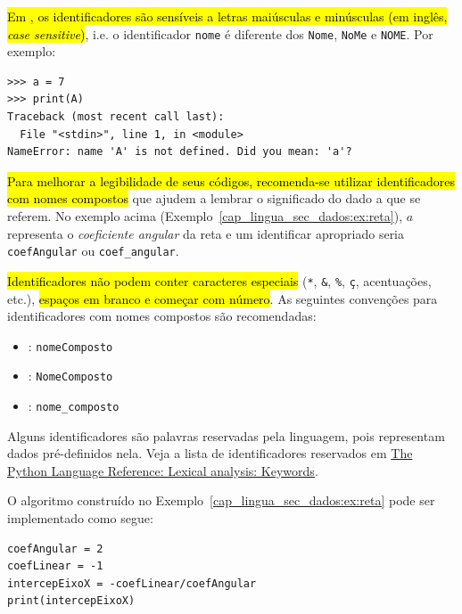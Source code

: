 \hl{Em {\python}, os identificadores são sensíveis a letras maiúsculas e minúsculas (em inglês, \textit{case sensitive})}, i.e. o identificador \lstinline+nome+ é diferente dos \lstinline+Nome+, \lstinline+NoMe+ e \lstinline+NOME+. Por exemplo:

\begin{lstlisting}
>>> a = 7
>>> print(A)
Traceback (most recent call last):
  File "<stdin>", line 1, in <module>
NameError: name 'A' is not defined. Did you mean: 'a'?
\end{lstlisting}

\hl{Para melhorar a legibilidade de seus códigos, recomenda-se utilizar identificadores com nomes compostos} que ajudem a lembrar o significado do dado a que se referem. No exemplo acima (Exemplo~\ref{cap_lingua_sec_dados:ex:reta}), $a$ representa o \emph{coeficiente angular} da reta e um identificar apropriado seria \lstinline+coefAngular+ ou \lstinline+coef_angular+.

\hl{Identificadores não podem conter caracteres especiais} (\lstinline+*+, \lstinline+&+, \lstinline+%+,
\lstinline+ç+, acentuações, etc.), \hl{espaços em branco e começar com número}. As seguintes convenções para identificadores com nomes compostos são recomendadas:
\begin{itemize}
\item {}: \lstinline+nomeComposto+
\item {}: \lstinline+NomeComposto+
\item {}: \lstinline+nome_composto+
\end{itemize}

Alguns identificadores são palavras reservadas pela linguagem, pois representam dados pré-definidos nela. Veja a lista de identificadores reservados em \href{https://docs.python.org/3/reference/lexical_analysis.html\#keywords}{The Python Language Reference: Lexical analysis: Keywords}.

\begin{ex}
  O algoritmo construído no Exemplo~\ref{cap_lingua_sec_dados:ex:reta} pode ser implementado como segue:

\begin{lstlisting}
coefAngular = 2
coefLinear = -1
intercepEixoX = -coefLinear/coefAngular
print(intercepEixoX)
\end{lstlisting}

\end{ex}

